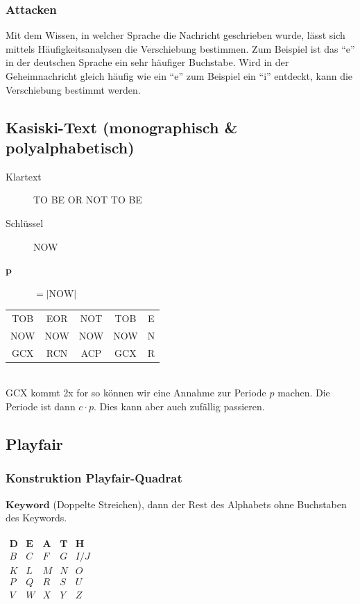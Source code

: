 \documentclass[landscape,twocolumn,a4paper]{article}
\newcommand{\T}[1]{\text{#1}} %
\newcommand{\Abs}[1]{\left| #1 \right|} %
\begin{document}
\subsubsection{Attacken}
Mit dem Wissen, in welcher Sprache die Nachricht geschrieben wurde, lässt sich mittels Häufigkeitsanalysen die Verschiebung bestimmen. Zum Beispiel ist das ``e'' in der deutschen Sprache ein sehr häufiger Buchstabe. Wird in der Geheimnachricht gleich häufig wie ein ``e'' zum Beispiel ein ``i'' entdeckt, kann die Verschiebung bestimmt werden.

\subsection{Kasiski-Text (monographisch \& polyalphabetisch)}
\begin{description}
	\item[Klartext] TO BE OR NOT TO BE
	\item[Schlüssel] NOW
	\item[$\mathbf{p}$] $=\Abs{\T{NOW}}$
\end{description}
\begin{tabular}{c|c|c|c|c}
 TOB&EOR&NOT&TOB&E\\
 NOW&NOW&NOW&NOW&N\\
 GCX&RCN&ACP&GCX&R
\end{tabular}\\
GCX kommt 2x for so können wir eine Annahme zur Periode $p$ machen. Die Periode ist dann $c\cdot p$. Dies kann aber auch zufällig passieren.

\subsection{Playfair}
\subsubsection{Konstruktion Playfair-Quadrat}
$\mathbf{Keyword}$ (Doppelte Streichen), dann der Rest des Alphabets ohne Buchstaben des Keywords.\\\\
$\begin{matrix}
\mathbf{D} & \mathbf{E} & \mathbf{A} & \mathbf{T} & \mathbf{H} \\
B & C & F & G & I/J \\
K & L & M & N & O \\
P & Q & R & S & U \\
V & W & X & Y & Z \\
\end{matrix}$
\end{document}
